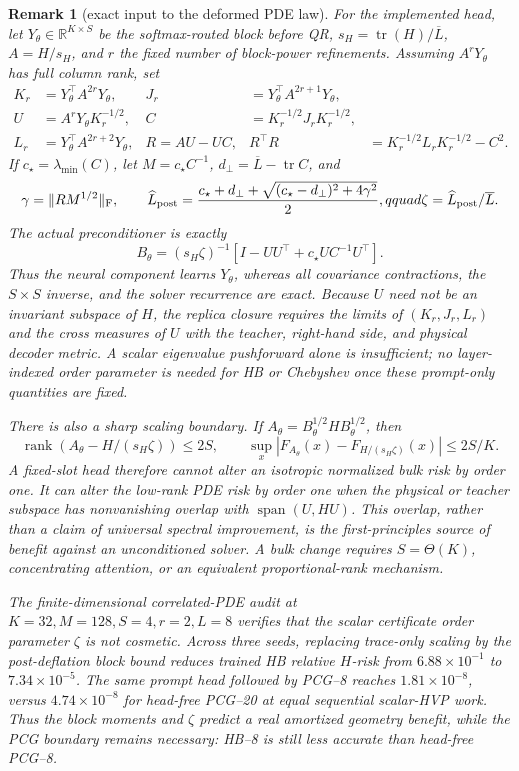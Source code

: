 \documentclass[11pt,a4paper]{article}
\newtheorem{remark}{Remark}
\theoremstyle{definition}
\begin{document}
\begin{remark}[exact input to the deformed PDE law]
For the implemented head, let \(Y_\theta\in\mathbb R^{K\times S}\) be the
softmax-routed block before QR,
\(s_H=\operatorname{tr}(H)/\overline L\), \(A=H/s_H\), and \(r\) the fixed number of
block-power refinements.  Assuming \(A^rY_\theta\) has full column rank, set
\begin{align}
 K_r&=Y_\theta^\top A^{2r}Y_\theta,
 &J_r&=Y_\theta^\top A^{2r+1}Y_\theta,\\
 U&=A^rY_\theta K_r^{-1/2},
 &C&=K_r^{-1/2}J_rK_r^{-1/2},\\
 L_r&=Y_\theta^\top A^{2r+2}Y_\theta,
 &R=AU-UC,&
 R^\top R&=K_r^{-1/2}L_rK_r^{-1/2}-C^2.
 \label{eq:pde-mf-ritz-interface}
\end{align}
If \(c_\star=\lambda_{\min}(C)\), let
\(M=c_\star C^{-1}\),
\(d_\perp=\overline L-\operatorname{tr}C\), and
\[
 \gamma=\|RM^{1/2}\|_{\mathrm F},\qquad
 \widehat L_{\rm post}
 =\frac{c_\star+d_\perp+
 \sqrt{(c_\star-d_\perp)^2+4\gamma^2}}{2},qquad
 \zeta=\widehat L_{\rm post}/\overline L.
\]
The actual preconditioner is exactly
\begin{equation}
 B_\theta=(s_H\zeta)^{-1}\left[
 I-UU^\top+c_\star UC^{-1}U^\top\right].
 \label{eq:pde-mf-preconditioner}
\end{equation}
Thus the neural component learns \(Y_\theta\), whereas all covariance
contractions, the \(S\times S\) inverse, and the solver recurrence are exact.
Because \(U\) need not be an invariant subspace of \(H\), the replica closure
requires the limits of \((K_r,J_r,L_r)\) and the cross measures of \(U\) with the
teacher, right-hand side, and physical decoder metric.  A scalar eigenvalue
pushforward alone is insufficient; no layer-indexed order parameter is needed
for HB or Chebyshev once these prompt-only quantities are fixed.

There is also a sharp scaling boundary.  If
\(A_\theta=B_\theta^{1/2}HB_\theta^{1/2}\), then
\[
 \operatorname{rank}(A_\theta-H/(s_H\zeta))\leq2S,
 \qquad
 \sup_x|F_{A_\theta}(x)-F_{H/(s_H\zeta)}(x)|\leq 2S/K.
\]
A fixed-slot head therefore cannot alter an isotropic normalized bulk risk by
order one.  It can alter the low-rank PDE risk by order one when the physical
or teacher subspace has nonvanishing overlap with
\(\operatorname{span}(U,HU)\).  This overlap, rather than a claim of universal
spectral improvement, is the first-principles source of benefit against an
unconditioned solver.  A bulk change requires \(S=\Theta(K)\), concentrating
attention, or an equivalent proportional-rank mechanism.

The finite-dimensional correlated-PDE audit at
$K=32,M=128,S=4,r=2,L=8$ verifies that the scalar certificate order parameter
$\zeta$ is not cosmetic.  Across three seeds, replacing trace-only scaling by
the post-deflation block bound reduces trained HB relative $H$-risk from
$6.88\times10^{-1}$ to $7.34\times10^{-5}$.  The same prompt head followed by
PCG--8 reaches $1.81\times10^{-8}$, versus $4.74\times10^{-8}$ for head-free
PCG--20 at equal sequential scalar-HVP work.  Thus the block moments and
$\zeta$ predict a real amortized geometry benefit, while the PCG boundary
remains necessary: HB--8 is still less accurate than head-free PCG--8.


\end{remark}
\end{document}
